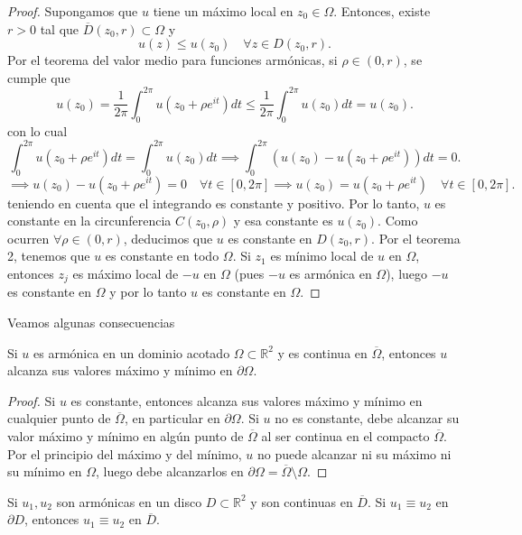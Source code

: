 \begin{proof}
    Supongamos que $u$ tiene un máximo local en $z_0 \in \Omega$. Entonces, existe $r > 0$ tal que $\overline{D}(z_0,r) \subset \Omega$ y
    \[
        u(z) \leq u(z_0) \quad \forall z \in D(z_0,r).
    \]
    Por el teorema del valor medio para funciones armónicas, si $\rho \in (0,r)$, se cumple que
    \[
        u(z_0) = \frac{1}{2\pi} \int_0^{2\pi} u(z_0 + \rho e^{it}) dt \leq \frac{1}{2\pi} \int_0^{2\pi} u(z_0) dt = u(z_0).
    \]
    con lo cual 
    \[
        \int_{0}^{2\pi} u(z_0 + \rho e^{it}) dt = \int_0^{2\pi} u(z_0) dt \implies \int_{0}^{2\pi} (u(z_0) - u(z_0 + \rho e^{it})) dt = 0.
    \]
    \[
        \implies u(z_0) - u(z_0 + \rho e^{it}) = 0 \quad \forall t \in [0,2\pi] \implies u(z_0) = u(z_0 + \rho e^{it}) \quad \forall t \in [0,2\pi].
    \]
    teniendo en cuenta que el integrando es constante y positivo.
    Por lo tanto, $u$ es constante en la circunferencia $C(z_0,\rho)$ y esa constante es $u(z_0)$. Como ocurren $\forall \rho \in (0,r)$, deducimos que $u$ es constante en $D(z_0,r)$. Por el teorema 2, tenemos que $u$ es constante en todo $\Omega$. Si $z_1$ es mínimo local de $u$ en $\Omega$, entonces $z_j$ es máximo local de $-u$ en $\Omega$ (pues $-u$ es armónica en $\Omega$), luego $-u$ es constante en $\Omega$ y por lo tanto $u$ es constante en $\Omega$.
\end{proof}

Veamos algunas consecuencias

\begin{corolario}
    Si $u$ es armónica en un dominio acotado $\Omega \subset \mathbb{R}^2$ y es continua en $\overline{\Omega}$, entonces $u$ alcanza sus valores máximo y mínimo en $\partial \Omega$.
\end{corolario}

\begin{proof}
    Si $u$ es constante, entonces alcanza sus valores máximo y mínimo en cualquier punto de $\overline{\Omega}$, en particular en $\partial \Omega$. Si $u$ no es constante, debe alcanzar su valor máximo y mínimo en algún punto de $\overline{\Omega}$ al ser continua en el compacto $\overline{\Omega}$. Por el principio del máximo y del mínimo, $u$ no puede alcanzar ni su máximo ni su mínimo en $\Omega$, luego debe alcanzarlos en $\partial \Omega = \overline{\Omega} \setminus \Omega$.
\end{proof}

\begin{corolario}
    Si $u_1,u_2$ son armónicas en un disco $D \subset \mathbb{R}^2$ y son continuas en $\overline{D}$. Si $u_1 \equiv u_2$ en $\partial D$, entonces $u_1 \equiv u_2$ en $\overline{D}$.
\end{corolario}

